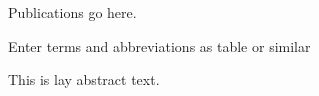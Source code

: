 
\uomtoc %
\uomlof %
\uomlot %
\begin{uomlop} %
  Publications go here.
\end{uomlop}
\begin{uomterms}
  Enter terms and abbreviations as table or similar
\end{uomterms}



\begin{abstract} %
  This is abstract text. 
  
  \lipsum[1-2]
\end{abstract}%
\clearpage



\begin{uomlay} %
  This is lay abstract text. 
  
  \lipsum[1-2]
\end{uomlay}



\begin{uomoriginality} %
  \uomoriginalitydeclaration 
\end{uomoriginality}



\uomcopyrightstatement %



